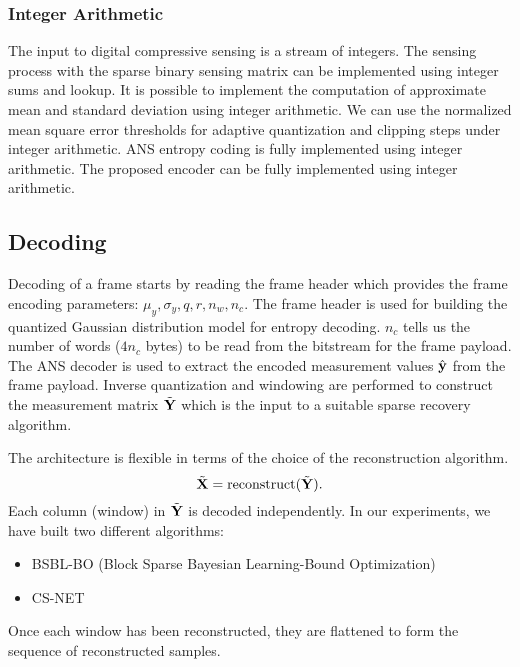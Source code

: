 \subsubsection{Integer Arithmetic}
The input to digital compressive sensing is a stream of integers.
The sensing process with
the sparse binary sensing matrix can be implemented
using integer sums and lookup.
It is possible to implement the computation of
approximate mean and standard deviation
using integer arithmetic.
We can use the normalized mean square error thresholds
for adaptive quantization and clipping steps under integer arithmetic.
ANS entropy coding is fully implemented using integer arithmetic.
The proposed encoder can be fully implemented using integer arithmetic.

\subsection{Decoding}
Decoding of a frame starts by reading the frame header
which provides the frame encoding parameters:
$\mu_y, \sigma_y, q, r, n_w, n_c$.
The frame header is used for building
the quantized Gaussian distribution model
for entropy decoding.
$n_c$ tells us the number of words ($4 n_c$ bytes) to be
read from the bitstream for the frame payload.
The ANS decoder is used to extract the encoded measurement
values $\hat{\mathbf{y}}$ from the frame payload.
Inverse quantization and windowing are performed
to construct the measurement matrix $\tilde{\mathbf{Y}}$
which is the input to a suitable sparse recovery algorithm.

The architecture is flexible in terms of the choice of the
reconstruction algorithm.
\begin{equation}
\tilde{\mathbf{X}} = \mathrm{reconstruct}(\tilde{\mathbf{Y}}).
\end{equation}
Each column (window) in $\tilde{\mathbf{Y}}$ is decoded independently.
In our experiments, we have built two different algorithms:
\begin{itemize}
  \item BSBL-BO (Block Sparse Bayesian Learning-Bound Optimization)
  \cite{zhang2013extension,zhang2012compressed,zhang2016comparison}
  \item CS-NET \cite{zhang2021csnet}
\end{itemize}
Once each window has been reconstructed, they are flattened
to form the sequence of reconstructed samples.

